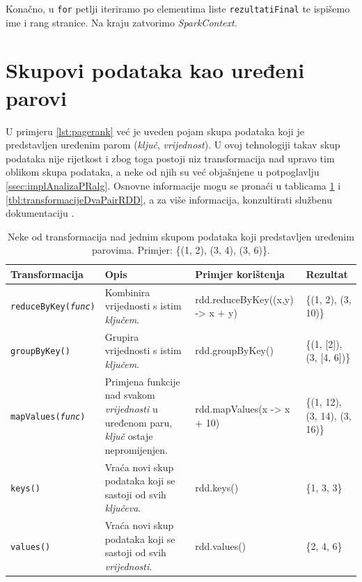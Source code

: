 \documentclass[times, utf8, zavrsni, numeric]{fer}
\begin{document}
Konačno, u \texttt{for} petlji iteriramo po elementima liste \texttt{rezultatiFinal} te ispišemo ime i rang stranice. Na kraju zatvorimo \emph{SparkContext}.


\section{Skupovi podataka kao uređeni parovi}
U primjeru \ref{lst:pagerank} već je uveden pojam skupa podataka koji je predstavljen uređenim parom (\emph{ključ}, \emph{vrijednost}). U ovoj tehnologiji takav skup podataka nije rijetkost i zbog toga postoji niz transformacija nad upravo tim oblikom skupa podataka, a neke od njih su već objašnjene u potpoglavlju \ref{ssec:implAnalizaPRalg}. Osnovne informacije mogu se pronaći u tablicama \ref{tbl:transformacijeJedanPairRDD} i \ref{tbl:transformacijeDvaPairRDD}, a za više informacija, konzultirati službenu dokumentaciju \cite{officialDocumentation}.

\begin{table}[htb]
\caption{Neke od transformacija nad jednim skupom podataka koji predstavljen uređenim parovima. Primjer: \{(1, 2), (3, 4), (3, 6)\}.}
\label{tbl:transformacijeJedanPairRDD}
\centering
\begin{tabular}{lp{3cm}p{4cm}p{1.5cm}} 
\hline
Transformacija & Opis & Primjer korištenja & Rezultat\\
\hline

\texttt{reduceByKey(\emph{func})} & Kombinira vrijednosti s istim \emph{ključem}. & rdd.reduceByKey((x,y) -> x + y) & \{(1, 2), (3, 10)\}\\

\texttt{groupByKey()} & Grupira vrijednosti s istim \emph{ključem}. & rdd.groupByKey() & \{(1, [2]), (3, [4, 6])\}\\

\texttt{mapValues(\emph{func})} & Primjena funkcije nad svakom \emph{vrijednosti} u uređenom paru, \emph{ključ} ostaje nepromijenjen. & rdd.mapValues(\newline x -> x + 10) & \{(1, 12), (3, 14), (3, 16)\}\\


\texttt{keys()} & Vraća novi skup podataka koji se sastoji od svih \emph{ključeva}. & rdd.keys() & \{1, 3, 3\}\\


\texttt{values()} & Vraća novi skup podataka koji se sastoji od svih \emph{vrijednosti}. & rdd.values() & \{2, 4, 6\}\\
\hline
\end{tabular}
\end{table}
\end{document}
